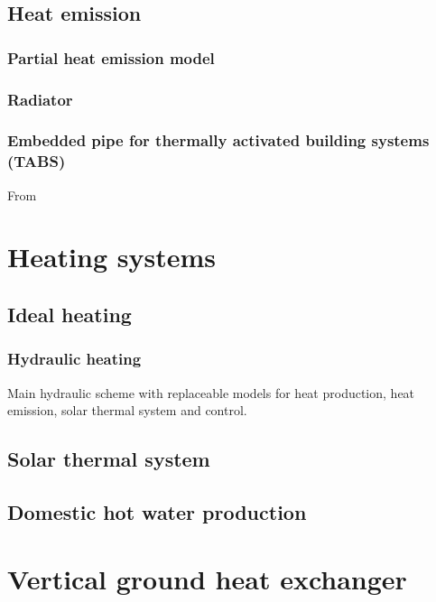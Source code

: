 \subsection{Heat emission}

\subsubsection{Partial heat emission model}

\vspace{6mm}

\subsubsection{Radiator}

\subsubsection{Embedded pipe for thermally activated building systems (TABS)}

From ~\cite{Koschenz2000}

\section{Heating systems}

\subsection{Ideal heating}

\subsubsection{Hydraulic heating}

Main hydraulic scheme with replaceable models for heat production, heat emission, solar thermal system and control.

\subsection{Solar thermal system}

\subsection{Domestic hot water production}

\section{Vertical ground heat exchanger}

